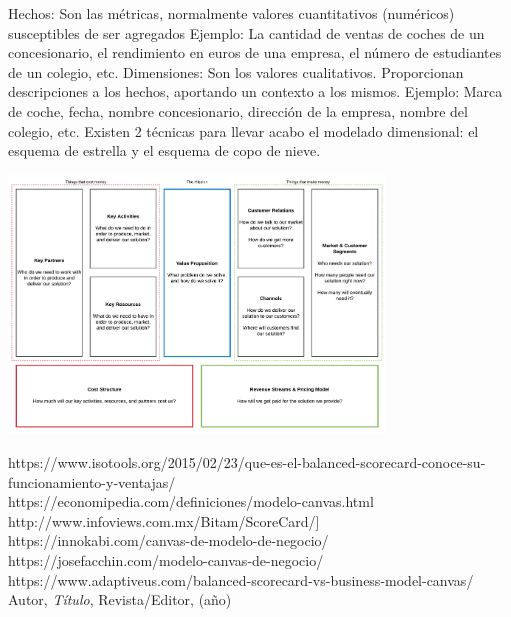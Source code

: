 Hechos: Son las métricas, normalmente valores cuantitativos (numéricos) susceptibles de ser agregados
Ejemplo: La cantidad de ventas de coches de un concesionario, el rendimiento en euros de una empresa, el número de estudiantes de un colegio, etc.
Dimensiones: Son los valores cualitativos. Proporcionan descripciones a los hechos, aportando un contexto a los mismos.
Ejemplo: Marca de coche, fecha, nombre concesionario, dirección de la empresa, nombre del colegio, etc.
Existen 2 técnicas para llevar acabo el modelado dimensional: el esquema de estrella y el esquema de copo de nieve.
\begin{center}
\includegraphics[width=10cm]{./Imagenes/imagen5}
\end{center}


\begin{thebibliography}{99}
https://www.isotools.org/2015/02/23/que-es-el-balanced-scorecard-conoce-su-funcionamiento-y-ventajas/\\
https://economipedia.com/definiciones/modelo-canvas.html\\
http://www.infoviews.com.mx/Bitam/ScoreCard/]\\
https://innokabi.com/canvas-de-modelo-de-negocio/\\
https://josefacchin.com/modelo-canvas-de-negocio/\\
https://www.adaptiveus.com/balanced-scorecard-vs-business-model-canvas/\\

 Autor, \emph{Título}, Revista/Editor, (año)

\end{thebibliography}


